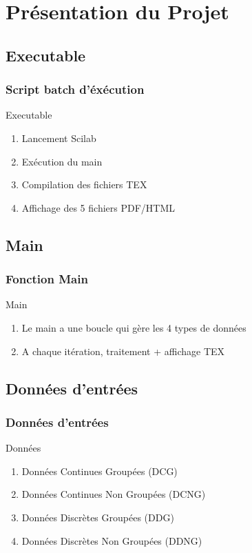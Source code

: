 \documentclass{beamer}
\begin{document}

\section{Présentation du Projet}

\subsection{Executable}
\begin{frame}[label=Executable]
\frametitle{Script batch d'éxécution}
\begin{beamerboxesrounded}[shadow=true]{Executable}
		\begin{enumerate}
			\item Lancement Scilab 
			\item Exécution du main
			\item Compilation des fichiers TEX
			\item Affichage des 5 fichiers PDF/HTML
		\end{enumerate}
\end{beamerboxesrounded}
\end{frame}


\subsection{Main}
\begin{frame}[label=Main]
\frametitle{Fonction Main}
\begin{beamerboxesrounded}[shadow=true]{Main}
		\begin{enumerate}
			\item Le main a une boucle qui gère les 4 types de données
			\item A chaque itération, traitement + affichage TEX	
		\end{enumerate}
\end{beamerboxesrounded}
\end{frame}


\subsection{Données d'entrées}
\begin{frame}[label=Données]
\frametitle{Données d'entrées}
\begin{beamerboxesrounded}[shadow=true]{Données}
		\begin{enumerate}
			\item Données Continues Groupées (DCG)
			\item Données Continues Non Groupées (DCNG)
			\item Données Discrètes Groupées (DDG)
			\item Données Discrètes Non Groupées (DDNG)
		\end{enumerate}
\end{beamerboxesrounded}
\end{frame}
\end{document}
